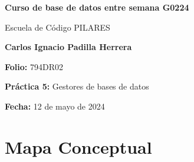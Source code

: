\documentclass{article}
\begin{document}
\begin{titlepage}
  \centering
  \vspace*{1cm}
  \Huge\textbf{Curso de base de datos entre semana G0224}
  
  \vspace{0.5cm}
  \LARGE Escuela de Código PILARES
  
  \vspace{1.5cm}
  \textbf{Carlos Ignacio Padilla Herrera}
  
  \vspace{2cm}
  \Large\textbf{Folio:} 794DR02
  
  \vspace{0.5cm}
  \Large\textbf{Práctica 5:} Gestores de bases de datos
  
  \vfill
  
  \Large\textbf{Fecha:} 12 de mayo de 2024
  
  \vspace{0.8cm}
\end{titlepage}

\newpage %

\section{Mapa Conceptual}
\end{document}
